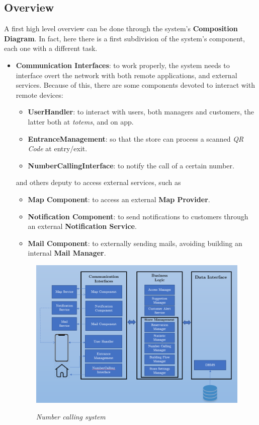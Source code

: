 \documentclass{article}
\begin{document}
	\subsection{Overview}
	A first high level overview can be done through the system's \textbf{Composition Diagram}. In fact, here there is a first subdivision of the system's component, each one with a different task.
	\begin{itemize}
		\item \textbf{Communication Interfaces}: to work properly, the system needs to interface overt the network with both remote applications, and external services. Because of this, there are some components devoted to interact with remote devices:
		\begin{itemize}
			\item{\bfseries UserHandler}: to interact with users, both managers and customers, the latter both at \emph{totems}, and on app.
			\item{\bfseries EntranceManagement}: so that the store can process a scanned \emph{QR Code} at entry/exit.
			\item{\bfseries NumberCallingInterface}: to notify the call of a certain number.
		\end{itemize}
		and others deputy to access external services, such as 
		\begin{itemize}
			\item{\bfseries Map Component}: to access an external {\bfseries Map Provider}.
			\item{\bfseries Notification Component}: to send notifications to customers through an external {\bfseries Notification Service}.
			\item{\bfseries Mail Component}: to externally sending mails, avoiding building an internal {\bfseries Mail Manager}.
		\end{itemize}
	\begin{figure}[!h]
		\begin{adjustwidth}{-2cm}{}
			\centering
			\includegraphics[scale=0.5]{../UML Diagrams/CompositionDiagram/CompositionDiagram.png} \\
		\end{adjustwidth}
		\caption{\emph{Number calling system}}
	\end{figure}
	

\end{itemize}
\end{document}
